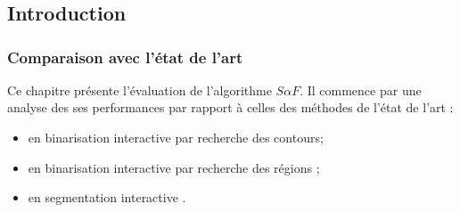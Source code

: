 \chapter{}

\section{Introduction}

\begin{emodif}
\subsection{Comparaison avec l'état de l'art}
Ce chapitre présente l'évaluation de l'algorithme $S \alpha F$. Il commence par une analyse des ses performances  par rapport à celles des méthodes de l'état de l'art :
\begin{itemize}
\item en binarisation interactive par recherche des contours;
\item en binarisation interactive par recherche des régions ;
\item en segmentation interactive .
\end{itemize}


\end{emodif}
